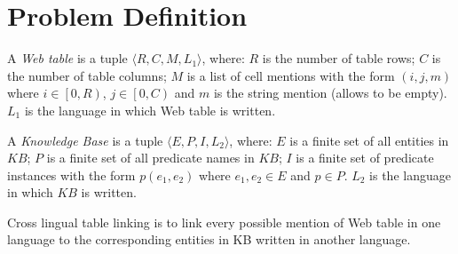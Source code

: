 \section{Problem Definition}
\label{sec:problem}

\begin{definition}
A {\em Web table} is a tuple $\langle R, C, M, L_1\rangle$, where:
$R$ is the number of table rows; 
$C$ is the number of table columns;
$M$ is a list of cell mentions with the form $(i, j, m)$ where $i\in\left[0, R\right)$, $j\in\left[0, C\right)$ and $m$ is the string mention (allows to be empty).
$L_1$ is the language in which Web table is written.
\end{definition}

\begin{definition}
A {\em Knowledge Base} is a tuple $\langle E, P, I, L_2\rangle$, where:
$E$ is a finite set of all entities in $KB$;
$P$ is a finite set of all predicate names in $KB$;
$I$ is a finite set of predicate instances with the form $p(e_1, e_2)$ where $e_1, e_2 \in E$ and $p \in P$.
$L_2$ is the language in which $KB$ is written.
\end{definition}

Cross lingual table linking is to link every possible mention of Web table in one language to the corresponding entities in KB written in another language. 

